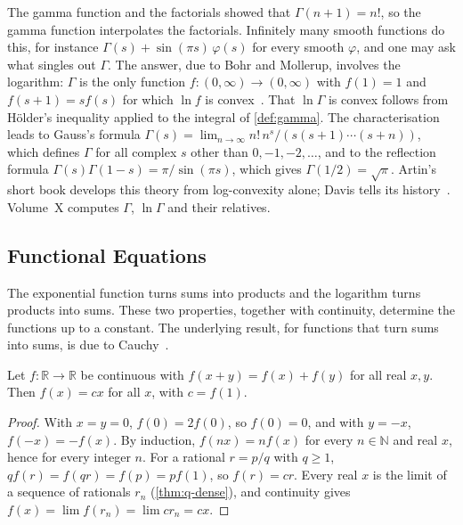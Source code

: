 \begin{note}{The gamma function and the factorials}
 showed that $\Gamma(n+1)=n!$, so the gamma function interpolates the factorials. Infinitely many smooth functions do this, for instance $\Gamma(s)+\sin(\pi s)\,\varphi(s)$ for every smooth $\varphi$, and one may ask what singles out $\Gamma$. The answer, due to Bohr and Mollerup, involves the logarithm: $\Gamma$ is the only function $f\colon(0,\infty)\to(0,\infty)$ with $f(1)=1$ and $f(s+1)=sf(s)$ for which $\ln f$ is convex~\cite{artin1964gamma}. That $\ln\Gamma$ is convex follows from H\"older's inequality applied to the integral of \cref{def:gamma}. The characterisation leads to Gauss's formula $\Gamma(s)=\lim_{n\to\infty}n!\,n^s/(s(s+1)\cdots(s+n))$, which defines $\Gamma$ for all complex $s$ other than $0,-1,-2,\ldots$, and to the reflection formula $\Gamma(s)\Gamma(1-s)=\pi/\sin(\pi s)$, which gives $\Gamma(1/2)=\sqrt\pi$. Artin's short book develops this theory from log-convexity alone; Davis tells its history~\cite{artin1964gamma,davis1959gamma}. Volume~X computes $\Gamma$, $\ln\Gamma$ and their relatives.
\end{note}

\subsection{Functional Equations}

The exponential function turns sums into products and the logarithm turns products into sums. These two properties, together with continuity, determine the functions up to a constant. The underlying result, for functions that turn sums into sums, is due to Cauchy~\cite{cauchy1821}.

\begin{theorem}
\label{thm:cauchy-functional}
Let $f\colon\mathbb R\to\mathbb R$ be continuous with $f(x+y)=f(x)+f(y)$ for all real $x,y$. Then $f(x)=cx$ for all $x$, with $c=f(1)$.
\end{theorem}

\begin{proof}
With $x=y=0$, $f(0)=2f(0)$, so $f(0)=0$, and with $y=-x$, $f(-x)=-f(x)$. By induction, $f(nx)=nf(x)$ for every $n\in\mathbb N$ and real $x$, hence for every integer $n$. For a rational $r=p/q$ with $q\ge1$, $qf(r)=f(qr)=f(p)=pf(1)$, so $f(r)=cr$. Every real $x$ is the limit of a sequence of rationals $r_n$ (\cref{thm:q-dense}), and continuity gives $f(x)=\lim f(r_n)=\lim cr_n=cx$.
\end{proof}

